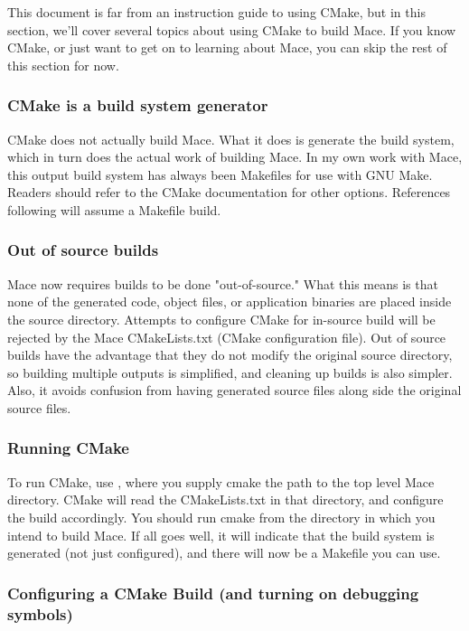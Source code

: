 This document is far from an instruction guide to using CMake, but in
this section, we'll cover several topics about using CMake to build
Mace.  If you know CMake, or just want to get on to learning about Mace,
you can skip the rest of this section for now.

\subsubsection{CMake is a build system generator}

CMake does not actually build Mace.  What it does is generate the build
system, which in turn does the actual work of building Mace.  In my own
work with Mace, this output build system has always been Makefiles for
use with GNU Make.  Readers should refer to the CMake documentation for
other options.  References following will assume a Makefile build.

\subsubsection{Out of source builds}

Mace now requires builds to be done "out-of-source."  What this means is
that none of the generated code, object files, or application binaries
are placed inside the source directory.  Attempts to configure CMake for
in-source build will be rejected by the Mace CMakeLists.txt (CMake
configuration file).  Out of source builds have the advantage that they
do not modify the original source directory, so building multiple
outputs is simplified, and cleaning up builds is also simpler.  Also, it
avoids confusion from having generated source files along side the
original source files.

\subsubsection{Running CMake}

To run CMake, use , where you supply cmake
the path to the top level Mace directory.  CMake will read the
CMakeLists.txt in that directory, and configure the build accordingly.
You should run cmake from the directory in which you intend to build
Mace.  If all goes well, it will indicate that the build system is
generated (not just configured), and there will now be a Makefile you
can use.

\subsubsection{Configuring a CMake Build (and turning on debugging symbols)}

